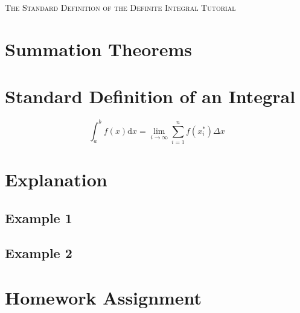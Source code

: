 \documentclass{article}
\begin{document}
   \centering
   \Huge
   \textsc{The Standard Definition of the Definite Integral Tutorial}
   \normalsize
   
   \section{Summation Theorems}
   
   
   
    \section{Standard Definition of an Integral}
    
    \begin{equation}
    	\int_a^b f(x) \mathrm{d} x = \lim_{i \to \infty} \sum_{i=1}^n f(x_i^*) \Delta x
    \end{equation}
    
    \section{Explanation}
        \subsection{Example 1}
        \subsection{Example 2}
    \section{Homework Assignment}
\end{document}
